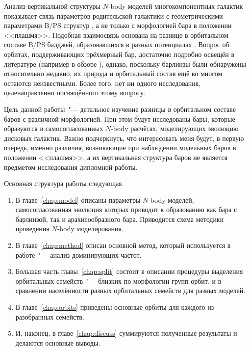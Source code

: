 \documentclass{trlnotes}
\begin{document}
Анализ вертикальной структуры $N$-body моделей многокомпонентных галактик показывает связь параметров родительской галактики с геометрическими параметрами B/PS структур \citep{smirnov2018}, а не только с морфологией бара в положении <<плашмя>>. Подобная взаимосвязь основана на разнице в орбитальном составе B/PS балджей, образовавшихся в разных потенциалах \citep{parul2020}. Вопрос об орбитах, поддерживающих трёхмерный бар, достаточно подробно освещён в литературе (например в обзоре \cite{athanassoula2016}), однако, поскольку барлинзы были обнаружены относительно недавно, их природа и орбитальный состав ещё во многом остаются неизвестными. Более того, нет ни одного исследования, целенаправленно посвящённого этому вопросу.

Цель данной работы~"--- детальное изучение разницы в орбитальном составе баров с  различной морфологией. При этом будут исследованы бары, которые образуются в самосогласованных $N$-body расчётах, моделирующих эволюцию дисковых галактик. Важно подчеркнуть, что интересовать меня будут, в первую очередь, именно различия, возникающие при наблюдении модельных баров в положении <<плашмя>>, а их вертикальная структура баров не является предметом исследования дипломной работы. 

Основная структура работы следующая.
\begin{enumerate}
\item В главе~\ref{chap:model} описаны параметры $N$-body моделей, самосогласованная эволюция которых приводит к образованию как бара с
  барлинзой, так и арахисообразного бара. Приводится схема методики проведения $N$-body моделирования.
\item В главе~\ref{chap:method} описан основной метод, который используется в работе~"--- анализ 
доминирующих частот.
\item Большая часть главы~\ref{chap:split} состоит в описании процедуры выделения орбитальных семейств~"---
близких по морфологии групп орбит, и в сравнении населённости разных орбитальных семейств для разных моделей. 
\item В главе~\ref{chap:orbits} приведены основные орбиты для каждого из разобранных семейств.
\item И, наконец, в главе~\ref{chap:discuss} суммируются полученные результаты и делаются основные выводы.
\end{enumerate}
\end{document}
